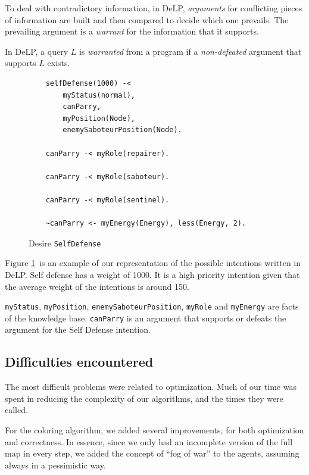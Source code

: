     To deal with contradictory information, in DeLP, \emph{arguments} for
    conflicting pieces of information are built and then compared to decide which
    one prevails. The prevailing argument is a \emph{warrant} for the information
    that it supports.

    In DeLP, a query $L$ is \emph{warranted} from a program if a \emph{non-defeated}
    argument that supports $L$ exists. %
    
    \begin{figure}
    \begin{small}
    \begin{Verbatim}
    selfDefense(1000) -<
        myStatus(normal),
        canParry,
        myPosition(Node),
        enemySaboteurPosition(Node).  

    canParry -< myRole(repairer).
        
    canParry -< myRole(saboteur).
        
    canParry -< myRole(sentinel).
        
    ~canParry <- myEnergy(Energy), less(Energy, 2). 
    \end{Verbatim}
    \end{small}
    \caption{Desire \texttt{SelfDefense}}
    \label{fig:SelfDefense}
    \end{figure}
    
    Figure \ref{fig:SelfDefense}\ is an example of our representation of the 
    possible intentions written in DeLP. 
    Self defense has a weight of 1000. It is a high priority intention given 
    that the average weight of the intentions is around 150.
    
    \texttt{myStatus}, \texttt{myPosition}, \texttt{enemySaboteurPosition}, \texttt{myRole} 
    and \texttt{myEnergy} are facts of the knowledge base. \texttt{canParry} is an argument that supports 
    or defeats the argument for the Self Defense intention.    
    

\subsection{Difficulties encountered}
    The most difficult problems were related to optimization. Much of our time was 
    spent in reducing the complexity of our algorithms, and the times they 
    were called.

    For the coloring algorithm, we added several improvements, for both 
    optimization and correctness. In essence, since we only had an incomplete 
    version of the full map in every step, we added the concept of ``fog of war'' 
    to the agents, assuming always in a pessimistic way. 

